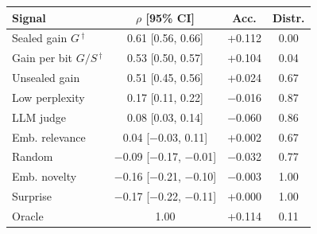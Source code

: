 \begin{tabular}{@{}lccc@{}}
\toprule
Signal & $\rho$ [95\% CI] & Acc. & Distr. \\
\midrule
Sealed gain $G$\,$^\dagger$ & 0.61 [0.56, 0.66] & +0.112 & 0.00 \\
Gain per bit $G/S$\,$^\dagger$ & 0.53 [0.50, 0.57] & +0.104 & 0.04 \\
Unsealed gain & 0.51 [0.45, 0.56] & +0.024 & 0.67 \\
Low perplexity & 0.17 [0.11, 0.22] & \ensuremath{-}0.016 & 0.87 \\
LLM judge & 0.08 [0.03, 0.14] & \ensuremath{-}0.060 & 0.86 \\
Emb. relevance & 0.04 [\ensuremath{-}0.03, 0.11] & +0.002 & 0.67 \\
Random & \ensuremath{-}0.09 [\ensuremath{-}0.17, \ensuremath{-}0.01] & \ensuremath{-}0.032 & 0.77 \\
Emb. novelty & \ensuremath{-}0.16 [\ensuremath{-}0.21, \ensuremath{-}0.10] & \ensuremath{-}0.003 & 1.00 \\
Surprise & \ensuremath{-}0.17 [\ensuremath{-}0.22, \ensuremath{-}0.11] & +0.000 & 1.00 \\
\midrule
Oracle & 1.00 & +0.114 & 0.11 \\
\bottomrule
\end{tabular}
